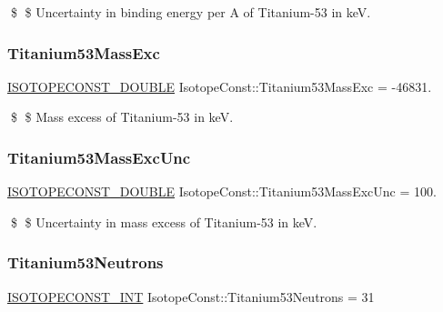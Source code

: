 \$ \$ Uncertainty in binding energy per A of Titanium-\/53 in keV. \mbox{\label{group___isotope_const-_titanium-_ti53_ga41c33cd9260627634d7df67982c9730e}} 
\subsubsection{\texorpdfstring{Titanium53\+Mass\+Exc}{Titanium53MassExc}}
{\footnotesize\ttfamily \mbox{\hyperlink{group___isotope_const-_macros_ga8f45a7272ce02c0b4c65c44636ed719a}{I\+S\+O\+T\+O\+P\+E\+C\+O\+N\+S\+T\+\_\+\+D\+O\+U\+B\+LE}} Isotope\+Const\+::\+Titanium53\+Mass\+Exc = -\/46831.}

\$ \$ Mass excess of Titanium-\/53 in keV. \mbox{\label{group___isotope_const-_titanium-_ti53_gacd0d9cc3f68409fd895437fcf9df37c7}} 
\subsubsection{\texorpdfstring{Titanium53\+Mass\+Exc\+Unc}{Titanium53MassExcUnc}}
{\footnotesize\ttfamily \mbox{\hyperlink{group___isotope_const-_macros_ga8f45a7272ce02c0b4c65c44636ed719a}{I\+S\+O\+T\+O\+P\+E\+C\+O\+N\+S\+T\+\_\+\+D\+O\+U\+B\+LE}} Isotope\+Const\+::\+Titanium53\+Mass\+Exc\+Unc = 100.}

\$ \$ Uncertainty in mass excess of Titanium-\/53 in keV. \mbox{\label{group___isotope_const-_titanium-_ti53_ga8e8e9060703c6ea9388c35664559f779}} 
\subsubsection{\texorpdfstring{Titanium53\+Neutrons}{Titanium53Neutrons}}
{\footnotesize\ttfamily \mbox{\hyperlink{group___isotope_const-_macros_ga5f18360b3e99483a35c32d789e62621c}{I\+S\+O\+T\+O\+P\+E\+C\+O\+N\+S\+T\+\_\+\+I\+NT}} Isotope\+Const\+::\+Titanium53\+Neutrons = 31}

